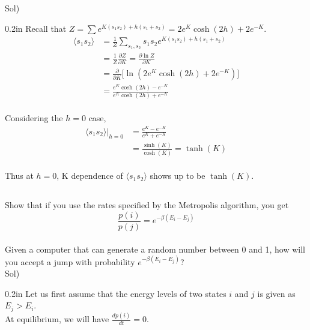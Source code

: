 \documentclass[paper=a4, fontsize=11pt]{scrartcl}
\numberwithin{equation}{section}
\numberwithin{figure}{section}
\numberwithin{table}{section}
\newcommand{\pder}[2]{\frac{\partial #1}{\partial #2}}
\newcommand{\expval}[1]{\langle #1 \rangle}
\newenvironment{problem}{\subsection{}}{}
\newenvironment{solution}{Sol) \begin{adjustwidth}{0.2in}{}\vspace{0.1in}}{\end{adjustwidth}}
\begin{document}
\begin{solution}
	Recall that $Z=\sum e^{K(s_1s_2)+h(s_1+s_2)}=2e^K\cosh(2h)+2e^{-K}$.\\[3pt]
	\begin{equation}
		\begin{split}
		\expval{s_1s_2}&= \frac{1}{Z} \sum_{s_1,s_2} s_1 s_2 e^{K(s_1s_2)+h(s_1+s_2)} \\[5pt]
		&= \frac{1}{Z} \pder{Z}{K} = \pder{\ln Z}{K} \\[5pt]
		&=  \pder{}{K} \bigg[\ln(2e^K\cosh(2h)+2e^{-K})\bigg] \\[5pt]
		&= \frac{e^K\cosh(2h)-e^{-K}}{e^K\cosh(2h)+e^{-K}}
		\end{split}
	\end{equation}\\[3pt]
	Considering the $h=0$ case,\\[3pt] 
	\begin{equation}
		\begin{split}
		\expval{s_1s_2}\bigr|_{h=0} &= \frac{e^K -e^{-K}}{e^K +e^{-K}} \\[5pt]
		&= \frac{\sinh(K)}{\cosh(K)} = \tanh(K)
		\end{split}
	\end{equation} \\[3pt]
	Thus at $h=0$, K dependence of $\expval{s_1 s_2}$ shows up to be $\tanh(K)$.
\end{solution}

\vskip 0.5in

\begin{problem}
	Show that if you use the rates specified by the Metropolis algorithm, you get \\[3pt]
	\begin{equation}
		\frac{p(i)}{p(j)} = e^{-\beta(E_i - E_j)}
		\nonumber
	\end{equation} \\[3pt]
	Given a computer that can generate a random number between 0 and 1, how will you accept a jump with probability $ e^{-\beta(E_i - E_j)}$?
\end{problem} \\

\begin{solution}
	Let us first assume that the energy levels of two states $i$ and $j$ is given as $E_j > E_i$.\\
	At equilibrium, we will have $\frac{dp(i)}{dt}=0$.
\end{solution}

\vskip 0.75in
\end{document}

